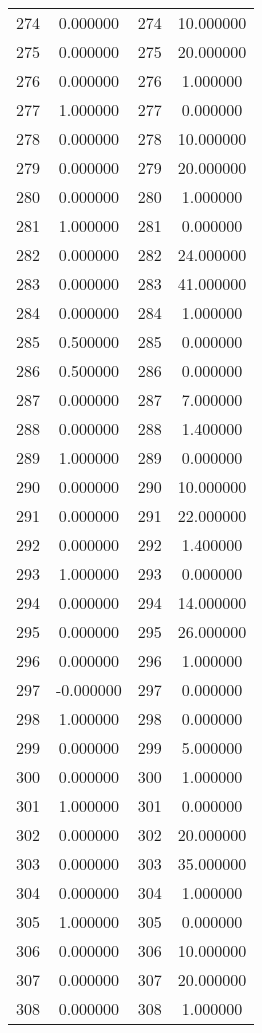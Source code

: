 \documentclass[12pt]{article}
\begin{document}
\begin{longtable}{@{}cccc@{}}
274 & 0.000000 & 274 & 10.000000 \\
275 & 0.000000 & 275 & 20.000000 \\
276 & 0.000000 & 276 & 1.000000 \\
277 & 1.000000 & 277 & 0.000000 \\
278 & 0.000000 & 278 & 10.000000 \\
279 & 0.000000 & 279 & 20.000000 \\
280 & 0.000000 & 280 & 1.000000 \\
281 & 1.000000 & 281 & 0.000000 \\
282 & 0.000000 & 282 & 24.000000 \\
283 & 0.000000 & 283 & 41.000000 \\
284 & 0.000000 & 284 & 1.000000 \\
285 & 0.500000 & 285 & 0.000000 \\
286 & 0.500000 & 286 & 0.000000 \\
287 & 0.000000 & 287 & 7.000000 \\
288 & 0.000000 & 288 & 1.400000 \\
289 & 1.000000 & 289 & 0.000000 \\
290 & 0.000000 & 290 & 10.000000 \\
291 & 0.000000 & 291 & 22.000000 \\
292 & 0.000000 & 292 & 1.400000 \\
293 & 1.000000 & 293 & 0.000000 \\
294 & 0.000000 & 294 & 14.000000 \\
295 & 0.000000 & 295 & 26.000000 \\
296 & 0.000000 & 296 & 1.000000 \\
297 & -0.000000 & 297 & 0.000000 \\
298 & 1.000000 & 298 & 0.000000 \\
299 & 0.000000 & 299 & 5.000000 \\
300 & 0.000000 & 300 & 1.000000 \\
301 & 1.000000 & 301 & 0.000000 \\
302 & 0.000000 & 302 & 20.000000 \\
303 & 0.000000 & 303 & 35.000000 \\
304 & 0.000000 & 304 & 1.000000 \\
305 & 1.000000 & 305 & 0.000000 \\
306 & 0.000000 & 306 & 10.000000 \\
307 & 0.000000 & 307 & 20.000000 \\
308 & 0.000000 & 308 & 1.000000 \\

\end{longtable}
\end{document}
